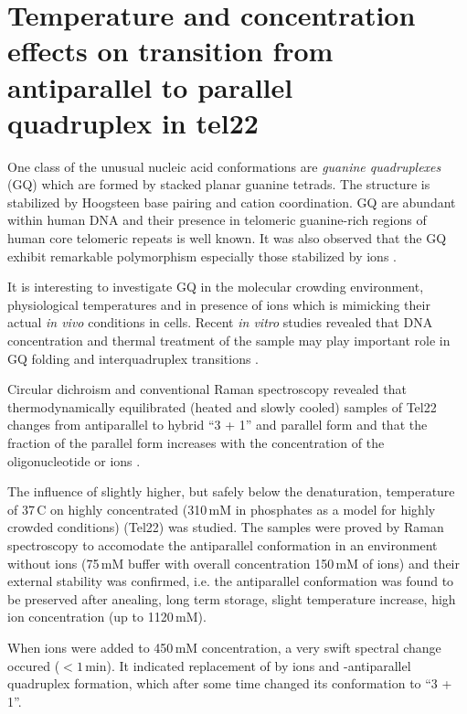 \section[%
	Temperature and concentration effects on transition from antiparallel	to
	parallel quadruplex in tel22 (optional)
]{%
	Temperature and concentration effects on transition from antiparallel to
	parallel\\quadruplex in tel22
}

One class of the unusual nucleic acid conformations are
\emph{guanine quadruplexes} (GQ)
which are formed by stacked planar guanine tetrads.
The structure is stabilized by Hoogsteen base pairing and cation coordination.
GQ are abundant within human DNA and their presence in telomeric guanine-rich
regions of human core telomeric repeats  is well known.
It was also observed that the GQ exhibit remarkable polymorphism especially
those stabilized by  ions
\parencite{Chaires2013}.

It is interesting to investigate GQ in the molecular crowding environment,
physiological temperatures and in presence of  ions which is mimicking
their actual \emph{in vivo} conditions in cells.
Recent \emph{in vitro} studies revealed that DNA concentration and thermal
treatment
of the sample may play important role in GQ folding and interquadruplex
transitions
\parencite{Palacky2013}.

Circular dichroism and conventional Raman spectroscopy revealed that
thermodynamically equilibrated (heated and slowly cooled) samples of Tel22
changes from antiparallel to hybrid “3 + 1” and parallel form and that
the fraction of the parallel form increases with the concentration of the
oligonucleotide or  ions
\parencite{Palacky2013}.

The influence of slightly higher, but safely below the denaturation,
temperature of 37\,\textdegree{}C on highly concentrated (310\,mM
in phosphates as a model for highly crowded conditions) 
(Tel22) was studied.
The samples were proved by Raman spectroscopy to accomodate the antiparallel
conformation in an environment without  ions (75\,mM 
buffer with overall concentration 150\,mM of  ions) and their external
stability was confirmed, i.e. the antiparallel conformation was found to be
preserved after anealing, long term storage, slight temperature increase, high
 ion concentration (up to 1120\,mM).

When  ions were added to 450\,mM concentration, a very swift spectral
change occured ($< 1$\,min). It indicated replacement of  by
 ions and -antiparallel quadruplex formation, which after
some time changed its conformation to “3 + 1”.

